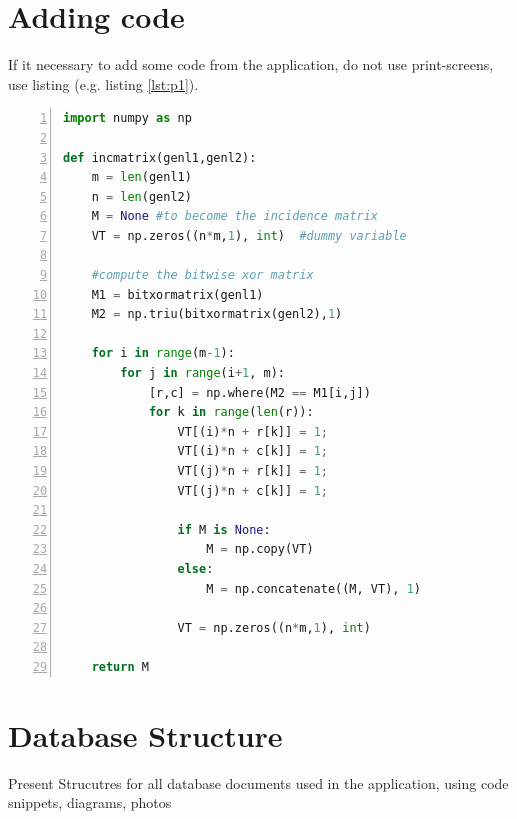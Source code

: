 \section{Adding code}
If it necessary to add  some code from the application, do not use print-screens, use  listing  (e.g. listing \ref{lst:p1}).
\begin{lstlisting}[language=Python, numbers=left,
    stepnumber=1, caption=Un exemplu de cod python, label=lst:p1]
import numpy as np
    
def incmatrix(genl1,genl2):
    m = len(genl1)
    n = len(genl2)
    M = None #to become the incidence matrix
    VT = np.zeros((n*m,1), int)  #dummy variable
    
    #compute the bitwise xor matrix
    M1 = bitxormatrix(genl1)
    M2 = np.triu(bitxormatrix(genl2),1) 

    for i in range(m-1):
        for j in range(i+1, m):
            [r,c] = np.where(M2 == M1[i,j])
            for k in range(len(r)):
                VT[(i)*n + r[k]] = 1;
                VT[(i)*n + c[k]] = 1;
                VT[(j)*n + r[k]] = 1;
                VT[(j)*n + c[k]] = 1;
                
                if M is None:
                    M = np.copy(VT)
                else:
                    M = np.concatenate((M, VT), 1)
                
                VT = np.zeros((n*m,1), int)
    
    return M
\end{lstlisting}

\section{Database Structure}

Present Strucutres for all database documents used in the application, using code snippets, diagrams, photos